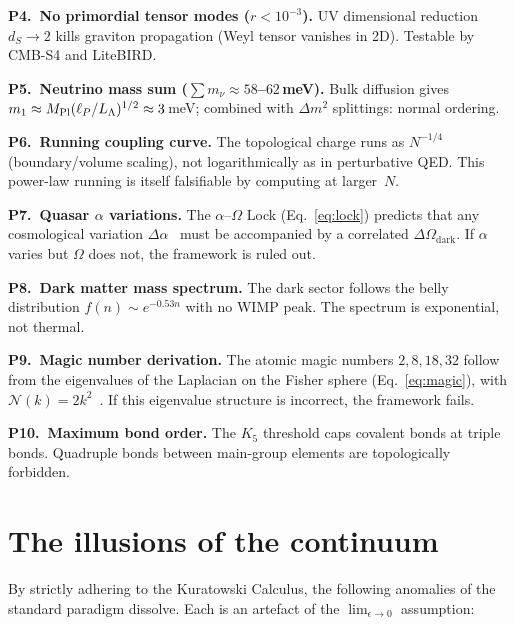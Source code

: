 \documentclass[aps,prd,twocolumn,superscriptaddress,nofootinbib,amsmath,amssymb,longbibliography]{revtex4-2}
\newcommand{\lp}{\ell_P}
\newcommand{\ds}{d_S}
\begin{document}
\textbf{P4.\ No primordial tensor modes ($r < 10^{-3}$).}
UV dimensional reduction $\ds \to 2$ kills graviton propagation
(Weyl tensor vanishes in 2D).
Testable by CMB-S4 and LiteBIRD.

\textbf{P5.\ Neutrino mass sum ($\sum m_\nu \approx 58$--$62$\,meV).}
Bulk diffusion gives
$m_1 \approx M_{\rm Pl}(\lp/L_\Lambda)^{1/2} \approx 3$\,meV;
combined with $\Delta m^2$ splittings: normal ordering.

\textbf{P6.\ Running coupling curve.}
The topological charge runs as $N^{-1/4}$ (boundary/volume scaling),
not logarithmically as in perturbative QED.
This power-law running is itself falsifiable by computing at larger~$N$.

\textbf{P7.\ Quasar $\alpha$ variations.}
The $\alpha$--$\Omega$ Lock (Eq.~\ref{eq:lock}) predicts that
any cosmological variation $\Delta\alpha$~\cite{webb2011} must be
accompanied by a correlated $\Delta\Omega_{\mathrm{dark}}$.
If $\alpha$ varies but $\Omega$ does not, the framework is ruled out.

\textbf{P8.\ Dark matter mass spectrum.}
The dark sector follows the belly distribution
$f(n) \sim e^{-0.53n}$ with no WIMP peak.
The spectrum is exponential, not thermal.

\textbf{P9.\ Magic number derivation.}
The atomic magic numbers $2, 8, 18, 32$ follow from the eigenvalues of
the Laplacian on the Fisher sphere (Eq.~\ref{eq:magic}), with
$\mathcal{N}(k) = 2k^2$~\cite{mayer1955}.
If this eigenvalue structure is incorrect, the framework fails.

\textbf{P10.\ Maximum bond order.}
The $K_5$ threshold caps covalent bonds at triple bonds.
Quadruple bonds between main-group elements are topologically forbidden.

\section{The illusions of the continuum}\label{sec:illusions}

By strictly adhering to the Kuratowski Calculus, the following anomalies
of the standard paradigm dissolve.  Each is an artefact of the
$\lim_{\epsilon \to 0}$ assumption:
\end{document}
